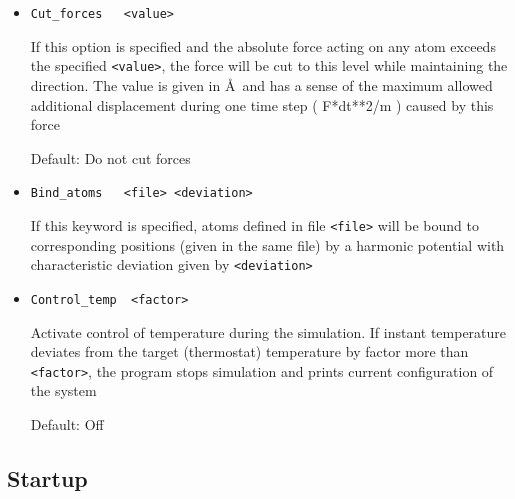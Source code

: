 \documentclass{article}
\begin{document}
\begin{itemize}
For Ewald: A is $\alpha /R_{cutoff}$, where $\alpha$ is the Ewald convergence 
parameter. Precision of the real-space Ewald part is determined by $erfc(A)$.
$B$ defines the number of terms in the reciprocal part. It cuts the reciprocal 
series when expression in the {\it exp} of the reciprocal part exceeds $B$.
Recommended values A = 2.5 -- 3;  B = 7 -- 10.

For reaction field, A is the dielectric permittivity and B is the Debye
screening length in \AA . Setting the Debye length to 0 means an infinite 
Debye length, i.e non-conducting solution.

If \verb|<type>| is ``Cutoff'', parameters $A$ and $B$ are not necessary, and
no special treatment of electrostatic forces out of $R_{cutoff}$ takes place.

Default:  Ewald method with A=2.8 and B=9.

\item
\verb|Cut_forces   <value>|

If this option is specified and the absolute force acting on any atom 
exceeds the specified \verb|<value>|, the force will be cut to this level while
maintaining the direction. The value is given in \AA ~and has a sense
of the maximum allowed additional displacement during one time step 
( F*dt**2/m ) caused by this force

Default: Do not cut forces

\item
\verb|Bind_atoms   <file> <deviation>|

If this keyword is specified, atoms defined in file \verb|<file>| will be
bound to corresponding positions (given in the same file) by a
harmonic potential with characteristic deviation given by \verb|<deviation>|

\item
\verb|Control_temp  <factor>|

Activate control of temperature during the simulation. If instant temperature 
deviates from the target (thermostat) temperature by factor more than 
\verb|<factor>|, the program stops simulation and prints current
configuration of the system

Default:  Off  


\end{itemize}

\subsection{Startup}
\end{document}
